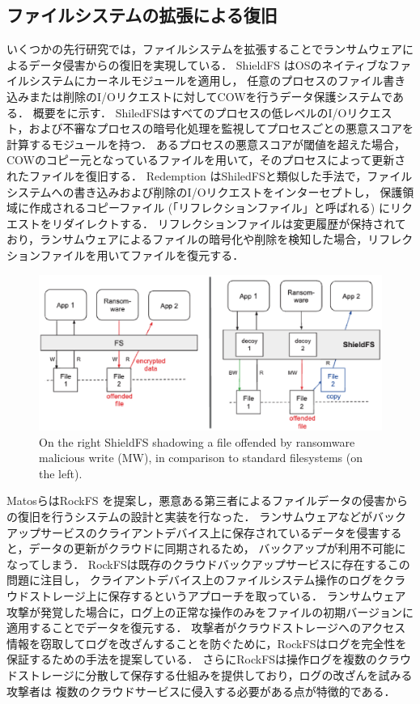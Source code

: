 \subsection{ファイルシステムの拡張による復旧}
いくつかの先行研究では，ファイルシステムを拡張することでランサムウェアによるデータ侵害からの復旧を実現している．
ShieldFS \cite{shieldFS} はOSのネイティブなファイルシステムにカーネルモジュールを適用し，
任意のプロセスのファイル書き込みまたは削除のI/Oリクエストに対してCOWを行うデータ保護システムである．
概要をに示す．
ShiledFSはすべてのプロセスの低レベルのI/Oリクエスト，および不審なプロセスの暗号化処理を監視してプロセスごとの悪意スコアを計算するモジュールを持つ．
あるプロセスの悪意スコアが閾値を超えた場合，COWのコピー元となっているファイルを用いて，そのプロセスによって更新されたファイルを復旧する．
Redemption \cite{kharraz2017redemption} はShiledFSと類似した手法で，ファイルシステムへの書き込みおよび削除のI/Oリクエストをインターセプトし，
保護領域に作成されるコピーファイル (「リフレクションファイル」と呼ばれる) にリクエストをリダイレクトする．
リフレクションファイルは変更履歴が保持されており，ランサムウェアによるファイルの暗号化や削除を検知した場合，リフレクションファイルを用いてファイルを復元する．
\begin{figure}[t]
  \begin{center}
    \includegraphics[width=\columnwidth]{doc/img/shieldFS.eps}
  \end{center}
  \caption{On the right ShieldFS shadowing a file offended by ransomware malicious write (MW), in comparison to standard filesystems (on the left). \cite{shieldFS}}
  \label{fig:shieldFS}
\end{figure}

MatosらはRockFS \cite{matos2018rockfs} を提案し，悪意ある第三者によるファイルデータの侵害からの復旧を行うシステムの設計と実装を行なった．
ランサムウェアなどがバックアップサービスのクライアントデバイス上に保存されているデータを侵害すると，データの更新がクラウドに同期されるため，
バックアップが利用不可能になってしまう．
RockFSは既存のクラウドバックアップサービスに存在するこの問題に注目し，
クライアントデバイス上のファイルシステム操作のログをクラウドストレージ上に保存するというアプローチを取っている．
ランサムウェア攻撃が発覚した場合に，ログ上の正常な操作のみをファイルの初期バージョンに適用することでデータを復元する．
攻撃者がクラウドストレージへのアクセス情報を窃取してログを改ざんすることを防ぐために，RockFSはログを完全性を保証するための手法を提案している．
さらにRockFSは操作ログを複数のクラウドストレージに分散して保存する仕組みを提供しており，ログの改ざんを試みる攻撃者は
複数のクラウドサービスに侵入する必要がある点が特徴的である．

